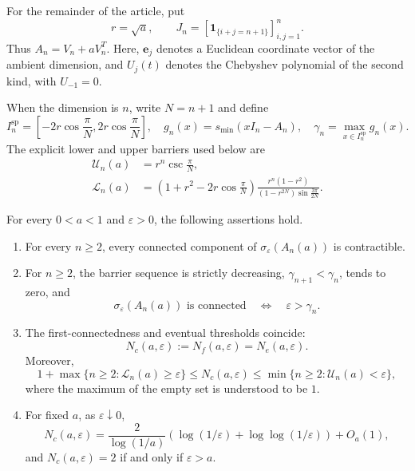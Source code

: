 \documentclass[review,hidelinks,onefignum,onetabnum]{siamart251216}
\begin{document}
For the remainder of the article, put
\[
 r=\sqrt a,\qquad
 J_n=[\boldsymbol 1_{\{i+j=n+1\}}]_{i,j=1}^n.
\]
Thus \(A_n=V_n+aV_n^T\).  Here, \(\mathbf e_j\) denotes a Euclidean
coordinate vector of the ambient dimension, and \(U_j(t)\) denotes the
Chebyshev polynomial of the second kind, with \(U_{-1}=0\).

When the dimension is \(n\), write \(N=n+1\) and define
\begin{equation}\label{eq:main-definitions}
 I_n^{\mathrm{sp}}=
 \left[-2r\cos\frac{\pi}{N},2r\cos\frac{\pi}{N}\right],
 \quad
 g_n(x)=s_{\min}(xI_n-A_n),
 \quad
 \gamma_n=\max_{x\in I_n^{\mathrm{sp}}}g_n(x).
\end{equation}
The explicit lower and upper barriers used below are
\begin{align}
 \mathcal U_n(a)&=r^n\csc\frac{\pi}{N},\label{eq:main-U-def}\\
 \mathcal L_n(a)&=
 \left(1+r^2-2r\cos\frac{\pi}{N}\right)
 \frac{r^n(1-r^2)}
 {(1-r^{2N})\sin\frac{3\pi}{2N}}.\label{eq:main-L-def}
\end{align}

\begin{theorem}\label{thm:main}
For every $0<a<1$ and $\varepsilon>0$, the following assertions hold.
\begin{enumerate}
\item For every $n\geq2$, every connected component of
$\sigma_\varepsilon(A_n(a))$ is
contractible.
\item For $n\geq2$, the barrier sequence is strictly decreasing,
$\gamma_{n+1}<\gamma_n$, tends to zero, and
\[
 \sigma_\varepsilon(A_n(a))\text{ is connected}
 \quad\Longleftrightarrow\quad \varepsilon>\gamma_n.
\]
\item The first-connectedness and eventual thresholds coincide:
\[
 N_c(a,\varepsilon):=N_f(a,\varepsilon)=N_e(a,\varepsilon).
\]
Moreover,
\begin{equation}\label{eq:N-two-sided-main}
 1+\max\{n\geq2:\mathcal L_n(a)\geq\varepsilon\}
 \leq N_c(a,\varepsilon)\leq
 \min\{n\geq2:\mathcal U_n(a)<\varepsilon\},
\end{equation}
where the maximum of the empty set is understood to be $1$.
\item For fixed $a$, as $\varepsilon\downarrow0$,
\begin{equation}\label{eq:N-asymptotic-main}
 N_c(a,\varepsilon)=\frac{2}{\log(1/a)}
 \left(\log(1/\varepsilon)+\log\!\log(1/\varepsilon)\right)+O_a(1),
\end{equation}
and $N_c(a,\varepsilon)=2$ if and only if $\varepsilon>a$.
\end{enumerate}
\end{theorem}
\end{document}
